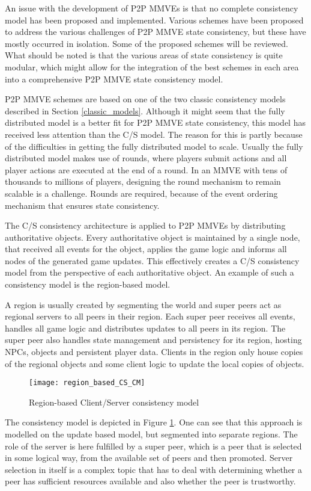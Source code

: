 An issue with the development of P2P MMVEs is that no complete consistency model has been proposed and implemented. Various schemes have been proposed to address the various challenges of P2P MMVE state consistency, but these have mostly occurred in isolation. Some of the proposed schemes will be reviewed. What should be noted is that the various areas of state consistency is quite modular, which might allow for the integration of the best schemes in each area into a comprehensive P2P MMVE state consistency model.

P2P MMVE schemes are based on one of the two classic consistency models described in Section \ref{classic_models}. Although it might seem that the fully distributed model is a better fit for P2P MMVE state consistency, this model has received less attention than the C/S model. The reason for this is partly because of the difficulties in getting the fully distributed model to scale. Usually the fully distributed model makes use of rounds, where players submit actions and all player actions are executed at the end of a round. In an MMVE with tens of thousands to millions of players, designing the round mechanism to remain scalable is a challenge. Rounds are required, because of the event ordering mechanism that ensures state consistency.

The C/S consistency architecture is applied to P2P MMVEs by distributing authoritative objects. Every authoritative object is maintained by a single node, that received all events for the object, applies the game logic and informs all nodes of the generated game updates. This effectively creates a C/S consistency model from the perspective of each authoritative object. An example of such a consistency model is the region-based model.

A region is usually created by segmenting the world and super peers act as regional servers to all peers in their region. Each super peer receives all events, handles all game logic and distributes updates to all peers in its region. The super peer also handles state management and persistency for its region, hosting NPCs, objects and persistent player data. Clients in the region only house copies of the regional objects and some client logic to update the local copies of objects.

\begin{figure}[htbp]
 \centering
 \texttt{[image: region\_based\_CS\_CM]}
 \caption{Region-based Client/Server consistency model}
 \label{fig_cs_region_cm}
\end{figure}
%
The consistency model is depicted in Figure \ref{fig_cs_region_cm}. One can see that this approach is modelled on the update based model, but segmented into separate regions. The role of the server is here fulfilled by a super peer, which is a peer that is selected in some logical way, from the available set of peers and then promoted. Server selection in itself is a complex topic that has to deal with determining whether a peer has sufficient resources available and also whether the peer is trustworthy.

